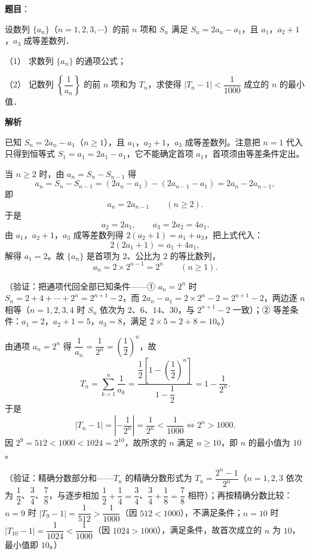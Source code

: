 \begin{answer}

\textbf{题目}：

设数列 \(\{a_n\}\)（\(n=1,2,3,\cdots\)）的前 \(n\) 项和 \(S_n\) 满足 \(S_n=2a_n-a_1\)，且 \(a_1\)，\(a_2+1\)，\(a_3\) 成等差数列．

（1） 求数列 \(\{a_n\}\) 的通项公式；

（2） 记数列 \(\left\{\dfrac{1}{a_n}\right\}\) 的前 \(n\) 项和为 \(T_n\)，求使得 \(|T_n-1|<\dfrac{1}{1000}\) 成立的 \(n\) 的最小值．

\textbf{解析}

已知 \(S_n=2a_n-a_1\)（\(n\geqslant1\)），且 \(a_1\)，\(a_2+1\)，\(a_3\) 成等差数列。注意把 \(n=1\) 代入只得到恒等式 \(S_1=a_1=2a_1-a_1\)，它不能确定首项 \(a_1\)，首项须由等差条件定出。


当 \(n\geqslant2\) 时，由 \(a_n=S_n-S_{n-1}\) 得
\nopagebreak[4]
\[
a_n=S_n-S_{n-1}=(2a_n-a_1)-(2a_{n-1}-a_1)=2a_n-2a_{n-1},
\]
即
\nopagebreak[4]
\[
a_n=2a_{n-1}\qquad(n\geqslant2).
\]
于是
\nopagebreak[4]
\[
a_2=2a_1,\qquad a_3=2a_2=4a_1.
\]
由 \(a_1\)，\(a_2+1\)，\(a_3\) 成等差数列得 \(2(a_2+1)=a_1+a_3\)，把上式代入：
\nopagebreak[4]
\[
2(2a_1+1)=a_1+4a_1,
\]
解得 \(a_1=2\)。故 \(\{a_n\}\) 是首项为 \(2\)、公比为 \(2\) 的等比数列，
\nopagebreak[4]
\[
a_n=2\times2^{n-1}=2^n\qquad(n\geqslant1).
\]

（验证：把通项代回全部已知条件——① \(a_n=2^n\) 时 \(S_n=2+4+\cdots+2^n=2^{n+1}-2\)，而 \(2a_n-a_1=2\times2^n-2=2^{n+1}-2\)，两边逐 \(n\) 相等（\(n=1,2,3,4\) 时 \(S_n\) 依次为 \(2\)、\(6\)、\(14\)、\(30\)，与 \(2^{n+1}-2\) 一致）；② 等差条件：\(a_1=2\)，\(a_2+1=5\)，\(a_3=8\)，满足 \(2\times5=2+8=10\)。）


由通项 \(a_n=2^n\) 得 \(\dfrac{1}{a_n}=\dfrac{1}{2^n}=\left(\dfrac12\right)^n\)，故
\nopagebreak[4]
\[
T_n=\sum_{k=1}^n\dfrac{1}{a_k}=\dfrac{\dfrac12\left[1-\left(\dfrac12\right)^n\right]}{1-\dfrac12}=1-\dfrac{1}{2^n}.
\]
于是
\nopagebreak[4]
\[
|T_n-1|=\left|-\dfrac{1}{2^n}\right|=\dfrac{1}{2^n}<\dfrac{1}{1000}\iff 2^n>1000.
\]
因 \(2^9=512<1000<1024=2^{10}\)，故所求的 \(n\) 满足 \(n\geqslant10\)，即 \(n\) 的最小值为 \(10\)。

（验证：精确分数部分和——\(T_n\) 的精确分数形式为 \(T_n=\dfrac{2^n-1}{2^n}\)（\(n=1,2,3\) 依次为 \(\dfrac12\)、\(\dfrac34\)、\(\dfrac78\)，与逐步相加 \(\dfrac12+\dfrac14=\dfrac34\)、\(\dfrac34+\dfrac18=\dfrac78\) 相符）；再按精确分数比较：\(n=9\) 时 \(|T_9-1|=\dfrac{1}{512}>\dfrac{1}{1000}\)（因 \(512<1000\)），不满足条件；\(n=10\) 时 \(|T_{10}-1|=\dfrac{1}{1024}<\dfrac{1}{1000}\)（因 \(1024>1000\)），满足条件，故首次成立的 \(n\) 为 \(10\)，最小值即 \(10\)。）


\end{answer}
